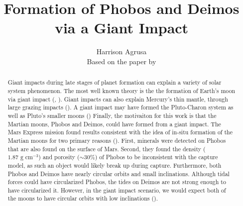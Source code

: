 \documentclass[preprint,12pt]{article}
\begin{document}


\title{\vspace{-.5in} \large Formation of Phobos and Deimos via a Giant Impact}
\author{ Harrison Agrusa \\ 
\small Based on the paper by \cite{citron2015}}

\maketitle

\begin{abstract}
Giant impacts during late stages of planet formation can explain a variety of solar system phenomenon. The most well known theory is the the formation of Earth's moon via giant impact (\cite{hartmann1975}, \cite{cameron1976}). Giant impacts can also explain Mercury's thin mantle, through large grazing impacts (\cite{asphaug2014}). A giant impact may have formed the Pluto-Charon system as well as Pluto's smaller moons (\cite{canup2011}) Finally, the motivaiton for this work is that the Martian moons, Phobos and Deimos, could have formed from a giant impact. The Mars Express mission found results consistent with the idea of in-situ formation of the Martian moons for two primary reasons (\cite{witasse2014}). First, minerals were detected on Phobos that are also found on the surface of Mars. Second, they found the density ($1.87 \text{ g cm}^{-3}$) and porosity ($\sim30\%$) of Phobos to be inconsistent with the capture model, as such an object would likely break up during capture. Furthermore, both Phobos and Deimos have nearly circular orbits and small inclinations. Although tidal forces could have circularized Phobos, the tides on Deimos are not strong enough to have circularized it. However, in the giant impact scenario, we would expect both of the moons to have circular orbits with low inclinations (\cite{rosenblatt2012}).



\end{abstract}
\end{document}
